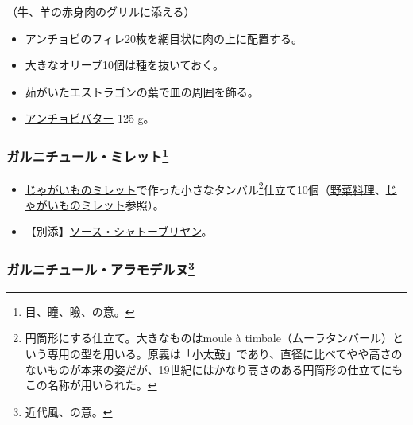 \begin{recette}


（牛、羊の赤身肉のグリルに添える）

\begin{itemize}
\item
  アンチョビのフィレ20枚を網目状に肉の上に配置する。
\item
  大きなオリーブ10個は種を抜いておく。
\item
  茹がいたエストラゴンの葉で皿の周囲を飾る。
\item
  \protect\hyperlink{beurre-d-anchois}{アンチョビバター} 125 g。
\end{itemize}

\atoaki{}

\hypertarget{garniture-mirette}{%
\subsubsection[ガルニチュール・ミレット]{\texorpdfstring{ガルニチュール・ミレット\footnote{目、瞳、瞼、の意。}}{ガルニチュール・ミレット}}\label{garniture-mirette}}



\begin{itemize}
\item
  \protect\hyperlink{pommes-de-terre-mirette}{じゃがいものミレット}で作った小さなタンバル\footnote{円筒形にする仕立て。大きなものはmoule
    à
    timbale（ムーラタンバール）という専用の型を用いる。原義は「小太鼓」であり、直径に比べてやや高さのないものが本来の姿だが、19世紀にはかなり高さのある円筒形の仕立てにもこの名称が用いられた。}仕立て10個（\protect\hyperlink{legumes}{野菜料理}、\protect\hyperlink{pommes-de-terre-mirette}{じゃがいものミレット}参照）。
\item
  【別添】\protect\hyperlink{sauce-chateaubriand}{ソース・シャトーブリヤン}。
\end{itemize}

\atoaki{}

\hypertarget{garniture-moderne}{%
\subsubsection[ガルニチュール・アラモデルヌ]{\texorpdfstring{ガルニチュール・アラモデルヌ\footnote{近代風、の意。}}{ガルニチュール・アラモデルヌ}}\label{garniture-moderne}}


\end{recette}
